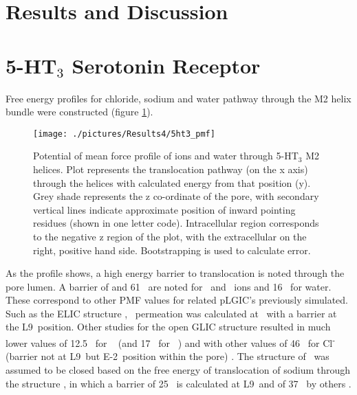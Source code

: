 \newpage

\section{Results and Discussion}

\section{5-HT$_3$ Serotonin Receptor}

Free energy profiles for chloride, sodium and water pathway through the M2 helix bundle were constructed (figure \ref{fig:5ht3_pmf}).

\begin{figure}[H]
\begin{center}
\texttt{[image: ./pictures/Results4/5ht3\_pmf]}
\caption[Potential of mean force profile of ions and water through 5-HT$_3$ M2 helices.] {Potential of mean force profile of ions and water through 5-HT$_3$ M2 helices. Plot represents the translocation pathway (on the x axis) through the helices with calculated energy from that position (y). Grey shade represents the z co-ordinate of the pore, with secondary vertical lines indicate approximate position of inward pointing residues (shown in one letter code). Intracellular region corresponds to the negative z region of the plot, with the extracellular on the right, positive hand side. Bootstrapping is used to calculate error.} 
\label{fig:5ht3_pmf}
\end{center}
\end{figure}

As the profile shows, a high energy barrier to translocation is noted through the pore lumen. A barrier of  and 61 \kj\ are noted for \Na\ and \Cl\ ions and 16 \kj\ for water. These correspond to other PMF values for related pLGIC's previously simulated. Such as the ELIC structure \cite{Zhu2012},  \Na\ permeation was calculated at  \kj\ with a barrier at the L9\textquotesingle\ position. Other studies for the open GLIC structure resulted in much lower values of 12.5 \kj\ for \Na\ \cite{Cheng2010} (and 17 \kj\ for \Na\ \cite{Zhu2012a}) and with other values of 46 \kj\  for Cl\textsuperscript{-} (barrier not at L9\textquotesingle\ but E-2\textquotesingle\ position within the pore) \cite{Fritsch2011a}. The structure of \na\ was assumed to be closed based on the free energy of translocation of sodium through the structure \cite{Beckstein2006b}, in which a barrier of 25 \kj\ is calculated at L9\textquotesingle\ and of 37 \kj\ by others \cite{Ivanov2007}. 

